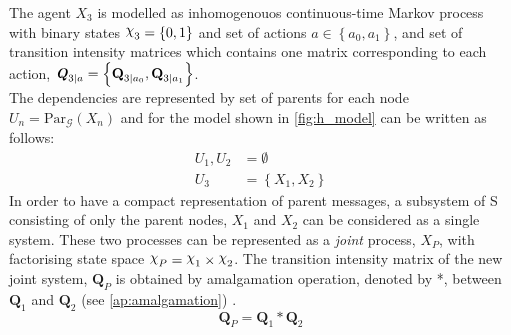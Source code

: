 The agent  $ X_{3} $ is modelled as inhomogenouos continuous-time Markov process with binary states $ \rchi_{3} = \left\lbrace 0, 1 \right\rbrace  $ and set of actions $ a \in \left\lbrace a_0, a_1\right\rbrace  $, and set of transition intensity matrices which contains one matrix corresponding to each action, $ \textbf{\textit{Q}}_{3 \mid a} = \left\lbrace \textbf{Q}_{3\mid a_{0}}, \textbf{Q}_{3\mid a_{1}} \right\rbrace $.\\
The dependencies are represented by set of parents for each node $ U_{n} = \mathrm{Par}_{\mathcal{G}}(X_n) $ and for the model shown in \cref{fig:h_model} can be written as follows:
\begin{align*}
U_{1}, U_{2} & = \emptyset \\
U_{3} & = \left\lbrace X_1, X_2 \right\rbrace 
\end{align*}
In order to have a compact representation of parent messages, a subsystem of S consisting of only the parent nodes, $ X_1 $ and $ X_2 $ can be considered as a single system. These two processes can be represented as a \textit{joint} process, $ X_P $, with factorising state space $ \rchi_{P} = \rchi_1 \times \rchi_2  $. The transition intensity matrix of the new joint system, $ \textbf{Q}_P $ is obtained by amalgamation operation, denoted by *, between $ \textbf{Q}_{1} $ and  $ \textbf{Q}_{2} $ (see \cref{ap:amalgamation}) \cite{Nodelman1995}.
\begin{equation}
\textbf{Q}_P = \textbf{Q}_{1} * \textbf{Q}_{2}
\end{equation}

